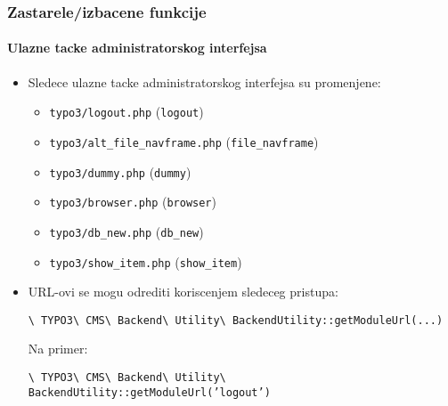 \begin{frame}[fragile]
	\frametitle{Zastarele/izbacene funkcije}
	\framesubtitle{Ulazne tacke administratorskog interfejsa}

	\begin{itemize}

		\item Sledece ulazne tacke administratorskog interfejsa su promenjene:

			\begin{itemize}
				\item \texttt{typo3/logout.php}					\tabto{6cm}(\begingroup\color{typo3orange}\texttt{logout}\endgroup)
				\item \texttt{typo3/alt\_file\_navframe.php}	\tabto{6cm}(\begingroup\color{typo3orange}\texttt{file\_navframe}\endgroup)
				\item \texttt{typo3/dummy.php}					\tabto{6cm}(\begingroup\color{typo3orange}\texttt{dummy}\endgroup)
				\item \texttt{typo3/browser.php}				\tabto{6cm}(\begingroup\color{typo3orange}\texttt{browser}\endgroup)
				\item \texttt{typo3/db\_new.php}				\tabto{6cm}(\begingroup\color{typo3orange}\texttt{db\_new}\endgroup)
				\item \texttt{typo3/show\_item.php}				\tabto{6cm}(\begingroup\color{typo3orange}\texttt{show\_item}\endgroup)
			\end{itemize}

		\item URL-ovi se mogu odrediti koriscenjem sledeceg pristupa:

			\smaller
				\texttt{\textbackslash
					TYPO3\textbackslash
					CMS\textbackslash
					Backend\textbackslash
					Utility\textbackslash
					BackendUtility::getModuleUrl(...)}
			\normalsize

			Na primer:

			\smaller
				\texttt{\textbackslash
					TYPO3\textbackslash
					CMS\textbackslash
					Backend\textbackslash
					Utility\textbackslash
					BackendUtility::getModuleUrl('}\begingroup\color{typo3orange}\texttt{logout}\endgroup\texttt{')}
			\normalsize

	\end{itemize}

\end{frame}


